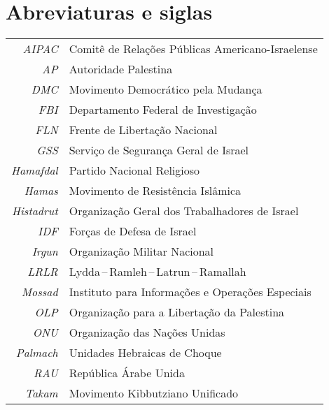 \chapter{Abreviaturas e siglas}

\begingroup%
\begin{tabular}{rl}
\textit{AIPAC} & Comitê de Relações Públicas Americano-Israelense\\
\textit{AP} & Autoridade Palestina\\
\textit{DMC} & Movimento Democrático pela Mudança\\
\textit{FBI} & Departamento Federal de Investigação\\
\textit{FLN} & Frente de Libertação Nacional\\
\textit{GSS} & Serviço de Segurança Geral de Israel\\
\textit{Hamafdal} & Partido Nacional Religioso\\
\textit{Hamas} & Movimento de Resistência Islâmica\\
\textit{Histadrut} & Organização Geral dos Trabalhadores de Israel\\
\textit{IDF} & Forças de Defesa de Israel\\
\textit{Irgun} & Organização Militar Nacional\\
\textit{LRLR} & Lydda\,--\,Ramleh\,--\,Latrun\,--\,Ramallah\\
\textit{Mossad} & Instituto para Informações e Operações Especiais\\
\textit{OLP} & Organização para a Libertação da Palestina\\
\textit{ONU} & Organização das Nações Unidas\\
\textit{Palmach} & Unidades Hebraicas de Choque\\
\textit{RAU} & República Árabe Unida\\
\textit{Takam} & Movimento Kibbutziano Unificado\\
\end{tabular}
\endgroup

\vfill
\pagebreak











